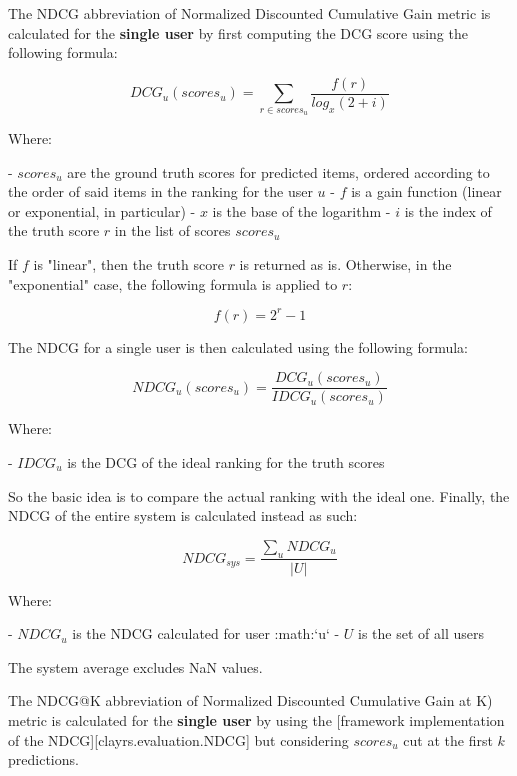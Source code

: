 The NDCG abbreviation of Normalized Discounted Cumulative Gain metric is calculated for the \textbf{single user}
by first computing the DCG score using the following formula:

    \[
    DCG_{u}(scores_{u}) = \sum_{r\in scores_{u}}{\frac{f(r)}{log_x(2 + i)}}
    \]

    Where:

    - $scores_{u}$ are the ground truth scores for predicted items, ordered according to the order of said items in the
        ranking for the user $u$
    - $f$ is a gain function (linear or exponential, in particular)
    - $x$ is the base of the logarithm
    - $i$ is the index of the truth score $r$ in the list of scores $scores_{u}$

\hfill\break

If $f$ is "linear", then the truth score $r$ is returned as is. Otherwise, in the "exponential" case, the following
formula is applied to $r$:

    \[
    f(r) = 2^{r} - 1
    \]

\hfill\break

The NDCG for a single user is then calculated using the following formula:

    \[
    NDCG_u(scores_{u}) = \frac{DCG_{u}(scores_{u})}{IDCG_{u}(scores_{u})}
    \]

    Where:

    - $IDCG_{u}$ is the DCG of the ideal ranking for the truth scores

\hfill\break

So the basic idea is to compare the actual ranking with the ideal one.
Finally, the NDCG of the entire system is calculated instead as such:

    \[
    NDCG_{sys} = \frac{\sum_{u} NDCG_u}{|U|}
    \]

    Where:

    - $NDCG_u$ is the NDCG calculated for user :math:`u`
    - $U$ is the set of all users

\hfill\break

The system average excludes NaN values.



The NDCG@K abbreviation of Normalized Discounted Cumulative Gain at K) metric is calculated for the \textbf{single user}
by using the [framework implementation of the NDCG][clayrs.evaluation.NDCG] but considering $scores_{u}$ cut at the
first $k$ predictions.

